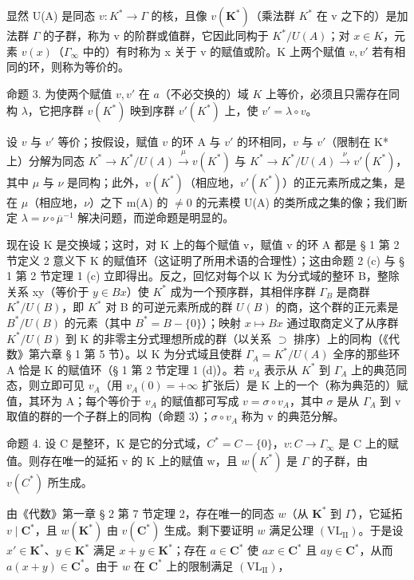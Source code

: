 显然 U(A) 是同态 \(v: K^{*} \to \Gamma\) 的核，且像 \(v(\mathbf{K}^{*})\)（乘法群 \(K^{*}\) 在 v 之下的）是加法群 \(\Gamma\) 的子群，称为 v 的阶群或值群，它因此同构于 \(K^{*}/U(A)\)；对 \(x \in K\)，元素 \(v(x)\)（\(\Gamma_{\infty}\) 中的）有时称为 x 关于 v 的赋值或阶。K 上两个赋值 \(v, v'\) 若有相同的环，则称为等价的。

命题 3. 为使两个赋值 \(v, v'\) 在 \(a\)（不必交换的）域 \(K\) 上等价，必须且只需存在同构 \(\lambda\)，它把序群 \(v(K^*)\) 映到序群 \(v'(K^*)\) 上，使 \(v' = \lambda \circ v\)。

设 \(v\) 与 \(v'\) 等价；按假设，赋值 \(v\) 的环 A 与 \(v'\) 的环相同，\(v\) 与 \(v'\)（限制在 K* 上）分解为同态 \(K^* \to K^*/U(A) \xrightarrow{\mu} v(K^*)\) 与 \(K^* \to K^*/U(A) \xrightarrow{\nu} v'(K^*)\)，其中 \(\mu\) 与 \(\nu\) 是同构；此外，\(v(K^*)\)（相应地，\(v'(K^*)\)）的正元素所成之集，是在 \(\mu\)（相应地，\(\nu\)）之下 m(A) 的 \(\neq 0\) 的元素模 U(A) 的类所成之集的像；我们断定 \(\lambda = \nu \circ \overline{\mu}^{-1}\) 解决问题，而逆命题是明显的。

现在设 K 是交换域；这时，对 K 上的每个赋值 v，赋值 v 的环 A 都是 § 1 第 2 节定义 2 意义下 K 的赋值环（这证明了所用术语的合理性）；这由命题 2 (c) 与 § 1 第 2 节定理 1 (c) 立即得出。反之，回忆对每个以 K 为分式域的整环 B，整除关系 x\textbar y（等价于 \(y \in Bx\)）使 \(K^{*}\) 成为一个预序群，其相伴序群 \(\Gamma_{B}\) 是商群 \(K^{*}/U(B)\)，即 \(K^{*}\) 对 B 的可逆元素所成的群 \(U(B)\) 的商，这个群的正元素是 \(B^{*}/U(B)\) 的元素（其中 \(B^{*} = B - \{0\}\)）；映射 \(x \mapsto Bx\) 通过取商定义了从序群 \(K^{*}/U(B)\) 到 K 的非零主分式理想所成的群（以关系 \(\supset\) 排序）上的同构（《代数》第六章 § 1 第 5 节）。以 K 为分式域且使群 \(\Gamma_{A} = K^{*}/U(A)\) 全序的那些环 A 恰是 K 的赋值环（§ 1 第 2 节定理 1 (d)）。若 \(v_{A}\) 表示从 \(K^{*}\) 到 \(\Gamma_{A}\) 上的典范同态，则立即可见 \(v_{A}\)（用 \(v_{A}(0) = +\infty\) 扩张后）是 K 上的一个（称为典范的）赋值，其环为 A；每个等价于 \(v_{A}\) 的赋值都可写成 \(v = \sigma \circ v_{A}\)，其中 \(\sigma\) 是从 \(\Gamma_{A}\) 到 v 取值的群的一个子群上的同构（命题 3）；\(\sigma \circ v_{A}\) 称为 v 的典范分解。

命题 4. 设 C 是整环，K 是它的分式域，\(C^{*} = C - \{0\}\)，\(v: C \to \Gamma_{\infty}\) 是 C 上的赋值。则存在唯一的延拓 v 的 K 上的赋值 w，且 \(w(K^{*})\) 是 \(\Gamma\) 的子群，由 \(v(C^{*})\) 所生成。

由《代数》第一章 § 2 第 7 节定理 2，存在唯一的同态 \(w\)（从 \(\mathbf{K}^*\) 到 \(\Gamma\)），它延拓 \(v \mid \mathbf{C}^*\)，且 \(w(\mathbf{K}^*)\) 由 \(v(\mathbf{C}^*)\) 生成。剩下要证明 \(w\) 满足公理 \((\mathrm{VL}_{\mathrm{II}})\)。于是设 \(x' \in \mathbf{K}^*\)、\(y \in \mathbf{K}^*\) 满足 \(x + y \in \mathbf{K}^*\)；存在 \(a \in \mathbf{C}^*\) 使 \(ax \in \mathbf{C}^*\) 且 \(ay \in \mathbf{C}^*\)，从而 \(a(x + y) \in \mathbf{C}^*\)。由于 \(w\) 在 \(\mathbf{C}^*\) 上的限制满足 \((\mathrm{VL}_{\mathrm{II}})\)，

